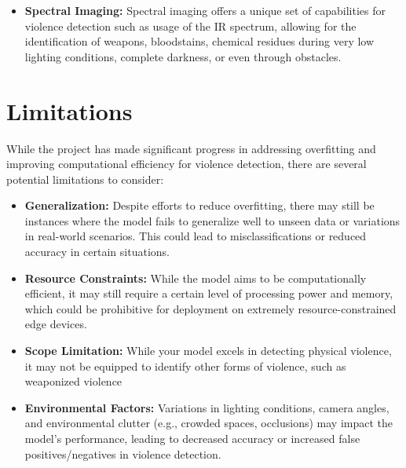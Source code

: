 \begin{itemize}

     \item \textbf{Spectral Imaging:} Spectral imaging\cite{spectral_image} offers a unique set of capabilities for violence detection such as usage of the IR spectrum, allowing for the identification of weapons, bloodstains, chemical residues during very low lighting conditions, complete darkness, or even through obstacles.

 
\end{itemize}

\section{Limitations}
While the project has made significant progress in addressing overfitting and improving computational efficiency for violence detection, there are several potential limitations to consider:
\begin{itemize}

      \item\textbf{Generalization:} Despite efforts to reduce overfitting, there may still be instances where the model fails to generalize well to unseen data or variations in real-world scenarios. This could lead to misclassifications or reduced accuracy in certain situations.
     
     \item\textbf{Resource Constraints:} While the model aims to be computationally efficient, it may still require a certain level of processing power and memory, which could be prohibitive for deployment on extremely resource-constrained edge devices.
    
     \item\textbf{Scope Limitation:} While your model excels in detecting physical violence, it may not be equipped to identify other forms of violence, such as weaponized violence
    
    \item\textbf{Environmental Factors:} Variations in lighting conditions, camera angles, and environmental clutter (e.g., crowded spaces, occlusions) may impact the model's performance, leading to decreased accuracy or increased false positives/negatives in violence detection. 
\end{itemize}


